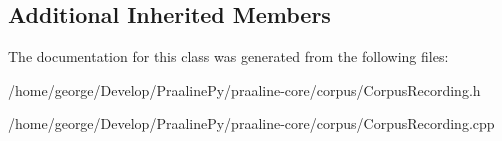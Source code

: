 \subsection*{Additional Inherited Members}


The documentation for this class was generated from the following files\+:\begin{DoxyCompactItemize}
\item 
/home/george/\+Develop/\+Praaline\+Py/praaline-\/core/corpus/Corpus\+Recording.\+h\item 
/home/george/\+Develop/\+Praaline\+Py/praaline-\/core/corpus/Corpus\+Recording.\+cpp\end{DoxyCompactItemize}
